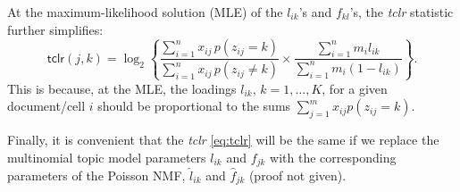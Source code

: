 \documentclass[final]{siamart171218}
\begin{document}
At the maximum-likelihood solution (MLE) of the $l_{ik}$'s and $f_{kl}$'s,
the {\em tclr} statistic further simplifies:
\begin{equation}
\mathsf{tclr}(j,k) = \log_2 \left\{ \frac{\sum_{i=1}^n x_{ij} \, p(z_{ij} = k)}
                       {\sum_{i=1}^n x_{ij} \, p(z_{ij} \neq k)} \times
                  \frac{\sum_{i=1}^n m_i l_{ik}}
                       {\sum_{i=1}^n m_i (1 - l_{ik})}
                  \right\}.
\end{equation}
This is because, at the MLE, the loadings $l_{ik}$, $k = 1, \ldots,
K$, for a given document/cell $i$ should be proportional to the sums
$\sum_{j=1}^m x_{ij} p(z_{ij} = k)$.

Finally, it is convenient that the {\em tclr} \eqref{eq:tclr} will be
the same if we replace the multinomial topic model parameters $l_{ik}$
and $f_{jk}$ with the corresponding parameters of the Poisson NMF,
$\hat{l}_{ik}$ and $\hat{f}_{jk}$ (proof not given).



\end{document}
